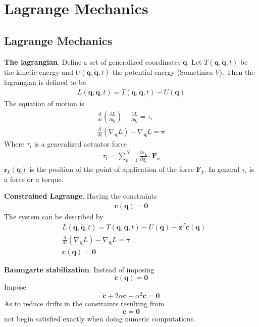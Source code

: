 \setcounter{section}{3}
\section{Lagrange Mechanics}
\setcounter{section}{8}
\setcounter{subsection}{1}
\subsection{Lagrange Mechanics} %

\textbf{The lagrangian}. Define a set of generalized coordinates \(\bm{q}\). Let
 \(T(\bm{q},\dot{\bm{q}},t)\) be the kinetic energy and 
\(U(\bm{q},\bm{\dot{q}},t)\) the potential energy (Sometimes \(V\)). Then the lagrangian is
defined to be
\begin{align*}
    L(\bm{q},\dot{\bm{q}},t) = T(\bm{q},\dot{\bm{q}},t)-U(\bm{q})
\end{align*}
The equation of motion is
\begin{align*}
    \frac{d}{dt}\left(\frac{\partial L}{\partial \dot{q_i}}\right) - \frac{\partial L}{\partial q_i} = \tau_i \\
    \frac{d}{dt}\left(\nabla_{\dot{\bm{q}}}L\right) - \nabla_{\bm{q}}L = \bm{\tau}
\end{align*}
Where \(\tau_i\) is a generalized actuator force
\begin{align*}
    \tau_i = \sum_{k=1}^{N}\frac{\partial \bm{r_k}}{\partial q_i} \cdot \bm{F}_k
\end{align*}
\(\bm{r}_k(\bm{q})\) is the position of the point of application of the force \(\bm{F}_k\).
In general \(\tau_i\) is a force or a torque.
\newline

\textbf{Constrained Lagrange}. Having the constraints
\begin{align*}
    \bm{c}(\bm{q}) = \bm{0}
\end{align*}
The system can be described by
\begin{align*}
    & L(\bm{q},\dot{\bm{q}},t) = T(\bm{q},\dot{\bm{q}},t)-U(\bm{q})  - \bm{z}^T\bm{c}(\bm{q}) \\
    & \frac{d}{dt}\left(\nabla_{\dot{\bm{q}}}L\right) - \nabla_{\bm{q}}L = \bm{\tau} \\
    & \bm{c}(\bm{q}) = \bm{0}
\end{align*}

\textbf{Baumgarte stabilization}. Instead of imposing
\[\ddot{\bm{c}}(\bm{q}) =\bm{0}\]
Impose
\[\ddot{\bm{c}}+2\alpha\dot{\bm{c}}+\alpha^2\bm{c} = \bm{0}\]
As to reduce drifts in the constraints resulting from 
\[\ddot{\bm{c}}=\bm{0}\]
not begin satisfied exactly when doing numeric computations.

